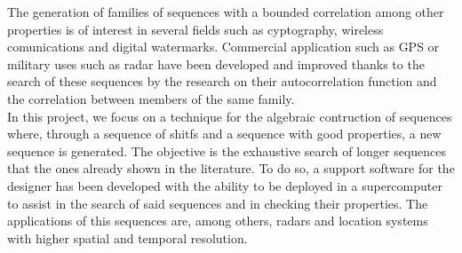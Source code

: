 The generation of families of sequences with a bounded correlation among other
properties is of interest in several fields such as cyptography,
wireless comunications and digital watermarks. Commercial application such as
GPS or military uses such as radar have been developed and improved thanks to
the search of these sequences by the research on their autocorrelation function
and the correlation between members of the same family.\\

In this project, we focus on a technique for the algebraic contruction of
sequences where, through a sequence of shitfs and a sequence with good
properties, a new sequence is generated. The objective is the exhaustive
search of longer sequences that the ones already shown in the literature.
To do so, a support software for the designer has been developed with the
ability to be deployed in a supercomputer to assist in the search of said
sequences and in checking their properties. The applications of this sequences
are, among others, radars and location systems with higher spatial and temporal
resolution.
